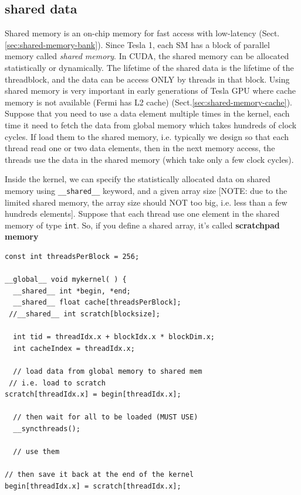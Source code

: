 \subsection{shared data}
\label{sec:cudac_shared_mem}

Shared memory is an on-chip memory for fast access with low-latency
(Sect.\ref{sec:shared-memory-bank}). Since Tesla 1, each SM has a block of
parallel memory called {\it shared memory}.
In CUDA, the shared memory can be allocated statistically or dynamically. The
lifetime of the shared data is the lifetime of the threadblock, and the data can
be access ONLY by threads in that block. Using shared memory is very important
in early generations of Tesla GPU where cache memory is not available (Fermi has
L2 cache) (Sect.\ref{sec:shared-memory-cache}). Suppose that you need to use a
data element multiple times in the kernel, each time it need to fetch the data
from global memory which takes hundreds of clock cycles. If load them to the
shared memory, i.e. typically we design so that each thread read one or two data
elements, then in the next memory access, the threads use the data in the shared
memory (which take only a few clock cycles).


Inside the kernel, we can specify the statistically allocated data on shared
memory using \verb!__shared__! keyword, and a given array size [NOTE: due to the
limited shared memory, the array size should NOT too big, i.e. less than a few
hundreds elements]. Suppose that each thread use one element in the shared
memory of type \verb!int!. So, if you define a shared array, it's called {\bf
scratchpad memory}

\begin{lstlisting}
const int threadsPerBlock = 256;

__global__ void mykernel( ) {
  __shared__ int *begin, *end;
  __shared__ float cache[threadsPerBlock];
 //__shared__ int scratch[blocksize];
  
  int tid = threadIdx.x + blockIdx.x * blockDim.x;
  int cacheIndex = threadIdx.x;
  
  // load data from global memory to shared mem
 // i.e. load to scratch
scratch[threadIdx.x] = begin[threadIdx.x];
  
  // then wait for all to be loaded (MUST USE)
  __syncthreads();
  
  // use them

// then save it back at the end of the kernel
begin[threadIdx.x] = scratch[threadIdx.x];
\end{lstlisting}

